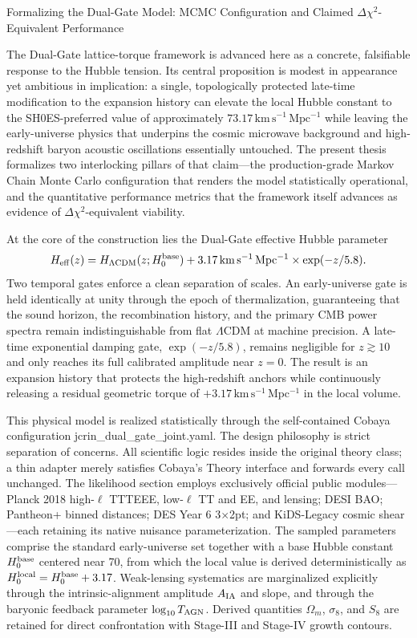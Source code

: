 Formalizing the Dual-Gate Model: MCMC Configuration and Claimed \(\Delta\chi^2\)-Equivalent Performance

The Dual-Gate lattice-torque framework is advanced here as a concrete, falsifiable response to the Hubble tension. Its central proposition is modest in appearance yet ambitious in implication: a single, topologically protected late-time modification to the expansion history can elevate the local Hubble constant to the SH0ES-preferred value of approximately \(73.17\,\mathrm{km\,s^{-1}\,Mpc^{-1}}\) while leaving the early-universe physics that underpins the cosmic microwave background and high-redshift baryon acoustic oscillations essentially untouched. The present thesis formalizes two interlocking pillars of that claim—the production-grade Markov Chain Monte Carlo configuration that renders the model statistically operational, and the quantitative performance metrics that the framework itself advances as evidence of \(\Delta\chi^2\)-equivalent viability.

At the core of the construction lies the Dual-Gate effective Hubble parameter
\[
H_{\rm eff}(z)=H_{\Lambda\mathrm{CDM}}(z;H_0^{\rm base})+3.17\,\mathrm{km\,s^{-1}\,Mpc^{-1}}\times\exp(-z/5.8).
\]
Two temporal gates enforce a clean separation of scales. An early-universe gate is held identically at unity through the epoch of thermalization, guaranteeing that the sound horizon, the recombination history, and the primary CMB power spectra remain indistinguishable from flat \(\Lambda\)CDM at machine precision. A late-time exponential damping gate, \(\exp(-z/5.8)\), remains negligible for \(z\gtrsim10\) and only reaches its full calibrated amplitude near \(z=0\). The result is an expansion history that protects the high-redshift anchors while continuously releasing a residual geometric torque of \(+3.17\,\mathrm{km\,s^{-1}\,Mpc^{-1}}\) in the local volume.

This physical model is realized statistically through the self-contained Cobaya configuration jcrin_dual_gate_joint.yaml. The design philosophy is strict separation of concerns. All scientific logic resides inside the original theory class; a thin adapter merely satisfies Cobaya’s Theory interface and forwards every call unchanged. The likelihood section employs exclusively official public modules—Planck 2018 high-\(\ell\) TTTEEE, low-\(\ell\) TT and EE, and lensing; DESI BAO; Pantheon+ binned distances; DES Year 6 3\(\times\)2pt; and KiDS-Legacy cosmic shear—each retaining its native nuisance parameterization. The sampled parameters comprise the standard early-universe set together with a base Hubble constant \(H_0^{\rm base}\) centered near 70, from which the local value is derived deterministically as \(H_0^{\rm local}=H_0^{\rm base}+3.17\). Weak-lensing systematics are marginalized explicitly through the intrinsic-alignment amplitude \(A_{\rm IA}\) and slope, and through the baryonic feedback parameter \(\log_{10}T_{\rm AGN}\). Derived quantities \(\Omega_m\), \(\sigma_8\), and \(S_8\) are retained for direct confrontation with Stage-III and Stage-IV growth contours.

